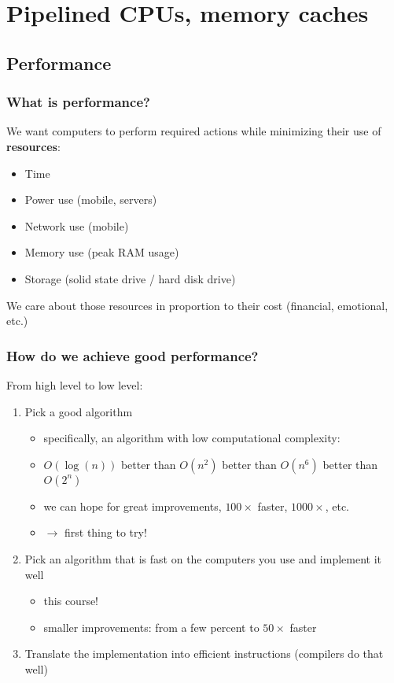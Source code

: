 \documentclass[12pt]{article}
\begin{document}
\newpage
\section{Pipelined CPUs, memory caches}

\subsection{Performance}

\subsubsection{What is performance?}

We want computers to perform required actions while minimizing their use of \textbf{resources}:
\begin{itemize}
    \item Time
    \item Power use (mobile, servers)
    \item Network use (mobile)
    \item Memory use (peak RAM usage)
    \item Storage (solid state drive / hard disk drive)
\end{itemize}

We care about those resources in proportion to their cost (financial, emotional, etc.)

\subsubsection{How do we achieve good performance?}
From high level to low level:
\begin{enumerate}
    \item Pick a good algorithm
    \begin{itemize}
        \item specifically, an algorithm with low computational complexity:
        \item $O(\log(n))$ better than $O(n^2)$ better than $O(n^6)$ better than $O(2^n)$
        \item we can hope for great improvements, $100\times$ faster, $1000\times$, etc.
        \item $\rightarrow$ first thing to try!
    \end{itemize}
    \item Pick an algorithm that is fast on the computers you use and implement it well
    \begin{itemize}
        \item this course!
        \item smaller improvements: from a few percent to $50\times$ faster
    \end{itemize}
    \item Translate the implementation into efficient instructions (compilers do that well)
\end{enumerate}
\end{document}
